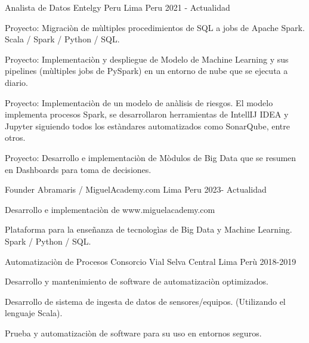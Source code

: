 

\begin{cventries}

  \cventry
    {Analista de Datos} %
    {Entelgy Peru} %
    {Lima Peru} %
    {2021 - Actualidad} %
    {
      \begin{cvitems} %
        \item {Proyecto: Migraci\`{o}n de m\`{u}ltiples procedimientos de SQL a jobs de Apache Spark. Scala / Spark / Python / SQL.}
        \item {Proyecto: Implementaci\`{o}n y despliegue de Modelo de Machine Learning y sus pipelines (m\`{u}ltiples jobs de PySpark) en un entorno de nube que se ejecuta a diario.}
        \item {Proyecto: Implementaci\`{o}n de un modelo de an\`{a}lisis de riesgos. El modelo implementa procesos Spark, se desarrollaron herramientas de IntellIJ IDEA y Jupyter siguiendo todos los est\`{a}ndares automatizados como SonarQube, entre otros.}
        \item {Proyecto: Desarrollo e implementaci\`{o}n de M\`{o}dulos de Big Data que se resumen en Dashboards para toma de decisiones.}
      \end{cvitems}
    }

  \cventry
  {Founder} %
  {Abramaris / MiguelAcademy.com} %
  {Lima Peru} %
  {2023- Actualidad} %
  {
    \begin{cvitems} %
      \item {Desarrollo e implementaci\`{o}n de www.miguelacademy.com}
      \item {Plataforma para la enseñanza de tecnolog\`{i}as de Big Data y Machine Learning. Spark / Python / SQL.}
    \end{cvitems}
  }
  \cventry
  {Automatizaci\`{o}n de Procesos} %
  {Consorcio Vial Selva Central} %
  {Lima Per\`{u}} %
  {2018-2019} %
  {
    \begin{cvitems} %
      \item {Desarrollo y mantenimiento de software de automatizaci\`{o}n optimizados.}
      \item {Desarrollo de sistema de ingesta de datos de sensores/equipos. (Utilizando el lenguaje Scala).}
      \item {Prueba y automatizaci\`{o}n de software para su uso en entornos seguros.}


\end{cvitems}}
\end{cventries}
